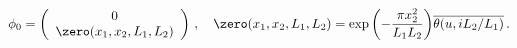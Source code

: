 \begin{equation}
\label{phi-0}
\phi_0 = \left( \begin{array}{c}
                 0 \\
		 \zero(x_1,x_2,L_1,L_2)
		 \end{array} \right) \, , \quad 
\zero(x_1,x_2,L_1,L_2) = 
\exp{\left(-\frac{\pi x_2^2}{L_1 L_2}\right)} 
\overline{\theta(u , i L_2/L_1)} \, .
\end{equation} 
